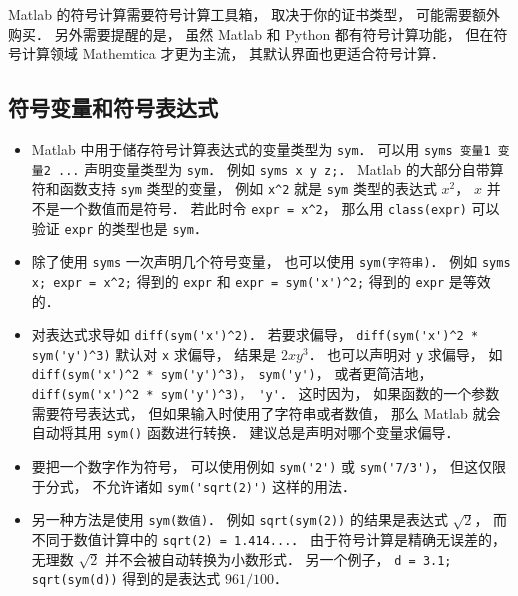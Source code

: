 

Matlab 的符号计算需要符号计算工具箱， 取决于你的证书类型， 可能需要额外购买． 另外需要提醒的是， 虽然 Matlab 和 Python 都有符号计算功能， 但在符号计算领域 Mathemtica 才更为主流， 其默认界面也更适合符号计算．

\subsection{符号变量和符号表达式}
\begin{itemize}
\item Matlab 中用于储存符号计算表达式的变量类型为 \verb|sym|． 可以用 \verb|syms 变量1 变量2 ...| 声明变量类型为 \verb|sym|． 例如 \verb|syms x y z;|． Matlab 的大部分自带算符和函数支持 \verb|sym| 类型的变量， 例如 \verb|x^2| 就是 \verb|sym| 类型的表达式 $x^2$， $x$ 并不是一个数值而是符号． 若此时令 \verb|expr = x^2|， 那么用 \verb|class(expr)| 可以验证 \verb|expr| 的类型也是 \verb|sym|．

\item 除了使用 \verb|syms| 一次声明几个符号变量， 也可以使用 \verb|sym(字符串)|． 例如 \verb|syms x; expr = x^2;| 得到的 \verb|expr| 和 \verb|expr = sym('x')^2;| 得到的 \verb|expr| 是等效的．

\item  对表达式求导如 \verb|diff(sym('x')^2)|． 若要求偏导， \verb|diff(sym('x')^2 * sym('y')^3)| 默认对 \verb|x| 求偏导， 结果是 $2x y^3$． 也可以声明对 \verb|y| 求偏导， 如 \verb|diff(sym('x')^2 * sym('y')^3)， sym('y')|， 或者更简洁地， \verb|diff(sym('x')^2 * sym('y')^3)， 'y'|． 这时因为， 如果函数的一个参数需要符号表达式， 但如果输入时使用了字符串或者数值， 那么 Matlab 就会自动将其用 \verb|sym()| 函数进行转换． 建议总是声明对哪个变量求偏导．

\item  要把一个数字作为符号， 可以使用例如 \verb|sym('2')| 或 \verb|sym('7/3')|， 但这仅限于分式， 不允许诸如 \verb|sym('sqrt(2)')| 这样的用法．

\item 另一种方法是使用 \verb|sym(数值)|． 例如 \verb|sqrt(sym(2))| 的结果是表达式 $\sqrt 2$， 而不同于数值计算中的 \verb|sqrt(2) = 1.414...|． 由于符号计算是精确无误差的， 无理数 $\sqrt{2}$ 并不会被自动转换为小数形式． 另一个例子， \verb|d = 3.1; sqrt(sym(d))| 得到的是表达式 $961/100$．


\end{itemize}
